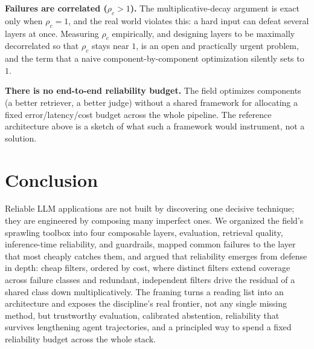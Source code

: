 \documentclass[11pt]{article}
\begin{document}
\textbf{Failures are correlated ($\rho_c > 1$).} The multiplicative-decay argument
is exact only when $\rho_c = 1$, and the real world violates this: a hard input
can defeat several layers at once. Measuring $\rho_c$ empirically, and designing
layers to be maximally decorrelated so that $\rho_c$ stays near $1$, is an open and
practically urgent problem, and the term that a naive component-by-component
optimization silently sets to $1$.

\textbf{There is no end-to-end reliability budget.} The field optimizes
components (a better retriever, a better judge) without a shared framework for
allocating a fixed error/latency/cost budget across the whole pipeline. The
reference architecture above is a sketch of what such a framework would
instrument, not a solution.

\section{Conclusion}

Reliable LLM applications are not built by discovering one decisive technique;
they are engineered by composing many imperfect ones. We organized the field's
sprawling toolbox into four composable layers, evaluation, retrieval quality,
inference-time reliability, and guardrails, mapped common failures to the layer
that most cheaply catches them, and argued that reliability emerges from
defense in depth: cheap filters, ordered by cost, where distinct filters extend
coverage across failure classes and redundant, independent filters drive the
residual of a shared class down multiplicatively. The framing turns a
reading list into an architecture and exposes the discipline's real frontier,
not any single missing method, but trustworthy evaluation, calibrated
abstention, reliability that survives lengthening agent trajectories, and a
principled way to spend a fixed reliability budget across the whole stack.

{\small


}
\end{document}
